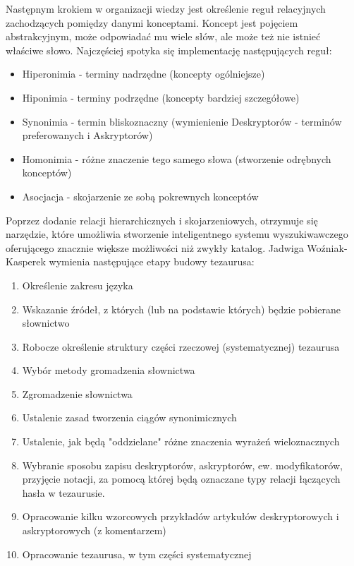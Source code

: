 \documentclass[12pt,a4paper,notitlepage]{article}
\begin{document}
Następnym krokiem w organizacji wiedzy jest określenie reguł relacyjnych zachodzących pomiędzy danymi konceptami. Koncept jest pojęciem abstrakcyjnym, może odpowiadać mu wiele słów, ale może też nie istnieć właściwe słowo. Najczęściej spotyka się implementację następujących reguł:
\begin{itemize}
   \item Hiperonimia - terminy nadrzędne (koncepty ogólniejsze)
	\item Hiponimia - terminy podrzędne (koncepty bardziej szczegółowe)
	\item Synonimia  - termin bliskoznaczny (wymienienie Deskryptorów - terminów preferowanych i Askryptorów)
	\item Homonimia - różne znaczenie tego samego słowa (stworzenie odrębnych konceptów)
	\item Asocjacja - skojarzenie ze sobą pokrewnych konceptów
\end{itemize} 
Poprzez dodanie relacji hierarchicznych i skojarzeniowych, otrzymuje się narzędzie, które umożliwia stworzenie inteligentnego systemu wyszukiwawczego oferującego znacznie większe możliwości niż zwykły katalog.   
Jadwiga Woźniak-Kasperek \cite{KasperekPoradnik} wymienia następujące etapy budowy tezaurusa: 
\begin{enumerate}
   \item Określenie zakresu języka
	\item Wskazanie  źródeł, z których (lub na podstawie których) będzie pobierane słownictwo
	\item Robocze określenie struktury części rzeczowej (systematycznej) tezaurusa 
	\item Wybór metody gromadzenia słownictwa
	\item Zgromadzenie słownictwa
	\item Ustalenie zasad tworzenia ciągów synonimicznych
	\item Ustalenie, jak będą "oddzielane" różne znaczenia wyrażeń wieloznacznych
	\item Wybranie sposobu zapisu deskryptorów, askryptorów, ew. modyfikatorów, przyjęcie notacji, za pomocą której będą oznaczane 
typy relacji łączących hasła w tezaurusie.
	\item  Opracowanie kilku wzorcowych przykładów artykułów deskryptorowych i 
askryptorowych (z komentarzem)
	\item Opracowanie tezaurusa, w tym części systematycznej
\end{enumerate}
\end{document}
